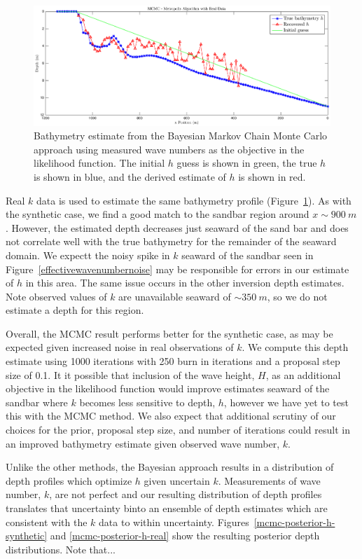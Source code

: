 \begin{figure}[H]
\center
\includegraphics[scale=0.46]{img/MCMC-realdata-600.eps}
\caption{Bathymetry estimate from the Bayesian Markov Chain Monte Carlo approach using measured wave numbers as the objective in the likelihood function. The initial $h$ guess is shown in green, the true $h$ is shown in blue, and the derived estimate of $h$ is shown in red.}
\label{mcmc-real}
\end{figure}

Real $k$ data is used to estimate the same bathymetry profile (Figure~\ref{mcmc-real}). As with the synthetic case, we find a good match to the sandbar region around $x\sim900~m$. However, the estimated depth decreases just seaward of the sand bar and does not correlate well with the true bathymetry for the remainder of the seaward domain. We expectt the noisy spike in $k$ seaward of the sandbar seen in  Figure~\ref{effectivewavenumbernoise} may be responsible for errors in our estimate of $h$ in this area. The same issue occurs in the other inversion depth estimates. Note observed values of $k$ are unavailable seaward of $\sim350~m$, so we do not estimate a depth for this region. 

Overall, the MCMC result performs better for the synthetic case, as may be expected given increased noise in real observations of $k$. We compute this depth estimate using 1000 iterations with 250 burn in iterations and a proposal step size of 0.1. It it possible that inclusion of the wave height, $H$, as an additional objective in the likelihood function would improve estimates seaward of the sandbar where $k$ becomes less sensitive to depth, $h$, however we have yet to test this with the MCMC method. We also expect that additional scrutiny of our choices for the prior, proposal step size, and number of iterations could result in an improved bathymetry estimate given observed wave number, $k$. 

Unlike the other methods, the Bayesian approach results in a distribution of depth profiles which optimize $h$ given uncertain $k$. Measurements of wave number, $k$, are not perfect and our resulting distribution of depth profiles translates that uncertainty binto an ensemble of depth estimates which are consistent with the $k$ data to within uncertainty. Figures~\ref{mcmc-posterior-h-synthetic} and \ref{mcmc-posterior-h-real} show the resulting posterior depth distributions. Note that...






